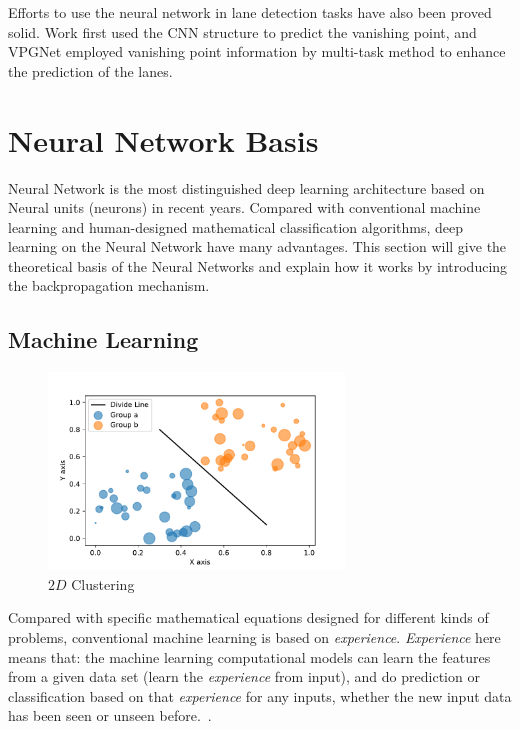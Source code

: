 \begin{spacing}{1.5}
Efforts to use the neural network in lane detection tasks have also been proved solid. Work \cite{borji2016vanishing} first used the CNN structure to predict the vanishing point, and VPGNet \cite{lee2017vpgnet} employed vanishing point information by multi-task method to enhance the prediction of the lanes.

\section{Neural Network Basis}
\label{sec:LR_NNB}

Neural Network is the most distinguished deep learning architecture based on Neural units (neurons) in recent years. Compared with conventional machine learning and human-designed mathematical classification algorithms, deep learning on the Neural Network have many advantages. This section will give the theoretical basis of the Neural Networks and explain how it works by introducing the backpropagation mechanism.

\subsection{Machine Learning}

\begin{figure}[ht]
\centering
\includegraphics[width=0.7\textwidth, fbox]{Chapter2/2dcluster.pdf}
\caption{$2D$ Clustering}
\label{fig:2dcluster} 
\end{figure}

Compared with specific mathematical equations designed for different kinds of problems, conventional machine learning is based on \textit{experience}. \textit{Experience} here means that: the machine learning computational models can learn the features from a given data set (learn the \textit{experience} from input), and do prediction or classification based on that \textit{experience} for any inputs, whether the new input data has been seen or unseen before.~\cite{mohri2018foundations}.


\end{spacing}
